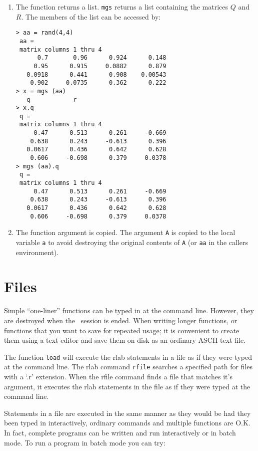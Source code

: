    \begin{enumerate}
      \item The function returns a list. \verb+mgs+ returns a list
            containing the matrices $Q$ and $R$. The members of the
            list can be accessed by:

            \begin{verbatim}
> aa = rand(4,4)
 aa =
 matrix columns 1 thru 4
      0.7       0.96      0.924      0.148  
     0.95      0.915     0.0882      0.879  
   0.0918      0.441      0.908    0.00543  
    0.902     0.0735      0.362      0.222  
> x = mgs (aa)
   q            r            
> x.q
 q =
 matrix columns 1 thru 4
     0.47      0.513      0.261     -0.669  
    0.638      0.243     -0.613      0.396  
   0.0617      0.436      0.642      0.628  
    0.606     -0.698      0.379     0.0378  
> mgs (aa).q
 q =
 matrix columns 1 thru 4
     0.47      0.513      0.261     -0.669  
    0.638      0.243     -0.613      0.396  
   0.0617      0.436      0.642      0.628  
    0.606     -0.698      0.379     0.0378  
             \end{verbatim}

      \item The function argument is copied. The argument \verb+A+ is
            copied to the local variable \verb+a+ to avoid destroying
            the original contents of \verb+A+ (or \verb+aa+ in the
            callers environment).
   \end{enumerate}

\section{Files}

   Simple ``one-liner'' functions can be typed in at the command line.
   However, they are destroyed when the \RLaB\ session is ended. When
   writing longer functions, or functions that you want to save for
   repeated usage; it is convenient to create them using a text editor
   and save them on disk as an ordinary ASCII text file.

   The function \verb+load+ will execute the rlab statements in a file
   as if they were typed at the command line. The rlab command
   \verb+rfile+ searches a specified path for files with a `.r'
   extension. When the rfile command finds a file that matches it's
   argument, it executes the rlab statements in the file as if they
   were typed at the command line.

   Statements in a file are executed in the same manner as they would
   be had they been typed in interactively, ordinary commands and
   multiple functions are O.K. In fact, complete programs can be
   written and run interactively or in batch mode. To run a program in
   batch mode you can try:

